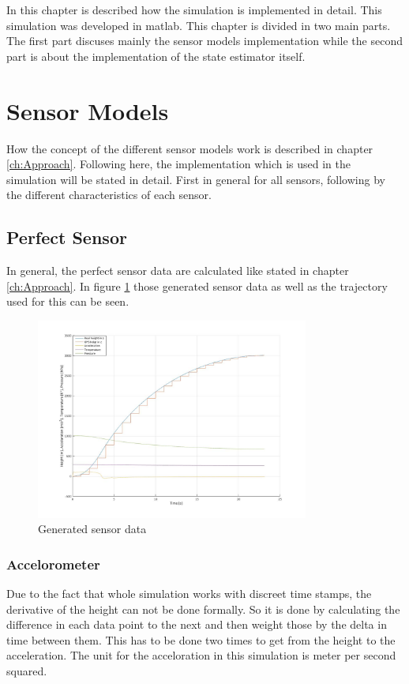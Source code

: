 In this chapter is described how the simulation is implemented in detail.
This simulation was developed in matlab.
This chapter is divided in two main parts.
The first part discuses mainly the sensor models implementation while the second part is about the implementation of the state estimator itself.

\section{Sensor Models}
How the concept of the different sensor models work is described in chapter \ref{ch:Approach}.
Following here, the implementation which is used in the simulation will be stated in detail.
First in general for all sensors, following by the different characteristics of each sensor.

\subsection{Perfect Sensor}
In general, the perfect sensor data are calculated like stated in chapter \ref{ch:Approach}.
In figure \ref{fig:GeneratedPerfectSensor} those generated sensor data as well as the trajectory used for this can be seen.

\begin{figure}[h!]
 \centering
 \includegraphics[width=0.8\textwidth]{./Pictures/GeneratedSensorData.jpg}
 \caption{Generated sensor data}
 \label{fig:GeneratedPerfectSensor}
\end{figure}

\subsubsection{Accelorometer}
Due to the fact that whole simulation works with discreet time stamps, the derivative of the height can not be done formally.
So it is done by calculating the difference in each data point to the next and then weight those by the delta in time between them.
This has to be done two times to get from the height to the acceleration.
The unit for the acceloration in this simulation is meter per second squared.

